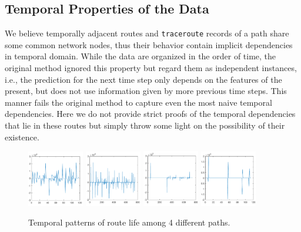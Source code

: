 \documentclass[sigconf]{acmart}
\begin{document}
	\subsection{Temporal Properties of the Data}
	We believe temporally adjacent routes and \texttt{traceroute} records of a path share some common network nodes, thus their behavior contain implicit dependencies in temporal domain. While the data are organized in the order of time, the original method ignored this property but regard them as independent instances, i.e., the prediction for the next time step only depends on the features of the present, but does not use information given by more previous time steps. This manner fails the original method to capture even the most naive temporal dependencies. Here we do not provide strict proofs of the temporal dependencies that lie in these routes but simply throw some light on the possibility of their existence.
	\begin{figure} 	
		\includegraphics[width=0.22\textwidth]{fig/total_life_8} 
		\label{fig:3.1a}
		\includegraphics[width=0.22\textwidth]{fig/total_life_20}
		\label{fig:3.1b}
		\includegraphics[width=0.22\textwidth]{fig/total_life_21}
		\label{fig:3.1c}
		\includegraphics[width=0.22\textwidth]{fig/total_life_30}
		\label{fig:3.1d}

		\caption{Temporal patterns of route life among 4 different paths.}
		\label{fig:3.1}  
	\end{figure}
\end{document}
